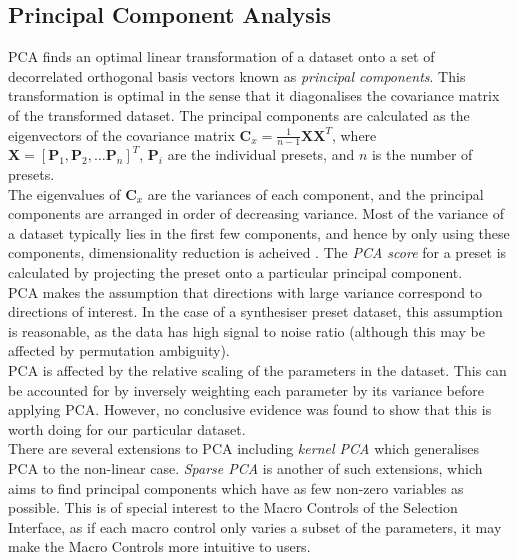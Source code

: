 \documentclass[11pt, oneside]{report}   	%
\renewcommand{\vec}[1]{\mathbf{#1}}
\begin{document}
\subsection{Principal Component Analysis}
PCA finds an optimal linear transformation of a dataset onto a set of decorrelated orthogonal basis vectors known as \emph{principal components}. This transformation is optimal in the sense that it diagonalises the covariance matrix of the transformed dataset. 
The principal components are calculated as the eigenvectors of the covariance matrix $\vec{C}_x = \frac{1}{n-1}\vec{X}\vec{X}^T$, where $\vec{X} = [\vec{P}_1, \vec{P}_2, \dots \vec{P}_n]^T$, $\vec{P}_i$ are the individual presets, and $n$ is the number of presets.\\
The eigenvalues of $\vec{C}_x$ are the variances of each component, and the principal components are arranged in order of decreasing variance.
Most of the variance of a dataset typically lies in the first few components, and hence by only using these components, dimensionality reduction is acheived \cite{PCA}. The \emph{PCA score} for a preset is calculated by projecting the preset onto a particular principal component.\\
PCA makes the assumption that directions with large variance correspond to directions of interest. In the case of a synthesiser preset dataset, this assumption is reasonable, as the data has high signal to noise ratio (although this may be affected by permutation ambiguity).\\
PCA is affected by the relative scaling of the parameters in the dataset. This can be accounted for by inversely weighting each parameter by its variance before applying PCA. However, no conclusive evidence was found to show that this is worth doing for our particular dataset.\\
There are several extensions to PCA including \emph{kernel PCA} which generalises PCA to the non-linear case. \emph{Sparse PCA} is another of such extensions, which aims to find principal components which have as few non-zero variables as possible. This is of special interest to the Macro Controls of the Selection Interface, as if each macro control only varies a subset of the parameters, it may make the Macro Controls more intuitive to users.
\end{document}
